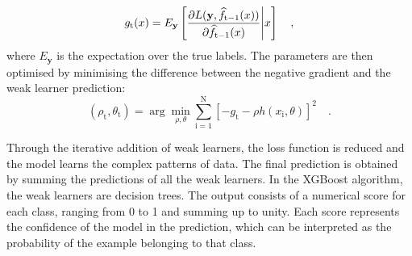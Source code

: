 \begin{equation*}
    g_\mathrm{t}(x) = E_{\mathbf{y}}\left[ \frac{\partial L(\mathbf{y},\widehat{f}_{\mathrm{t}-1}(x))}{\partial \widehat{f}_{\mathrm{t}-1}(x)} \Bigg{|} x \right] \quad ,
\end{equation*}
where $E_{\mathbf{y}}$ is the expectation over the true labels. The parameters are then optimised by minimising the difference between the negative gradient and the weak learner prediction:
\begin{equation*}
    (\rho_\mathrm{t}, \theta_\mathrm{t}) = \arg\min_{\rho,\theta} \sum_{\mathrm{i}=1}^{\mathrm{N}} \left[-g_\mathrm{t} - \rho h(x_\mathrm{i},\theta)\right]^{2}\quad .
\end{equation*}

Through the iterative addition of weak learners, the loss function is reduced and the model learns the complex patterns of data. The final prediction is obtained by summing the predictions of all the weak learners. In the XGBoost algorithm, the weak learners are decision trees. The output consists of a numerical score for each class, ranging from 0 to 1 and summing up to unity. Each score represents the confidence of the model in the prediction, which can be interpreted as the probability of the example belonging to that class.
